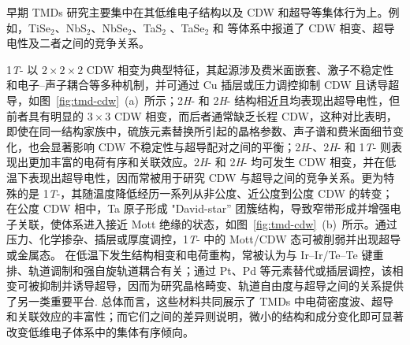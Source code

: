 早期 TMDs 研究主要集中在其低维电子结构以及 CDW 和超导等集体行为上。例如，TiSe$_2$、NbS$_2$、NbSe$_2$、TaS$_2$ 、TaSe$_2$ 和  等体系中报道了 CDW 相变、超导电性及二者之间的竞争关系\cite{vanmaarenSuperconductivitygroupVa1966,castronetoChargeDensityWave2001,rossnagelFermisurfacechargedensitywave2005,liuTuningchargedensity2015,siposMottstatesuperconductivity2008}。

1\textit{T}- 以 \(2\times2\times2\) CDW 相变为典型特征，其起源涉及费米面嵌套、激子不稳定性和电子--声子耦合等多种机制，并可通过 Cu 插层或压力调控抑制 CDW 且诱导超导\cite{castronetoChargeDensityWave2001,rossnagelFermisurfacechargedensitywave2005,morosanSuperconductivityCuxTiSe22006}，如图~\ref{fig:tmd-cdw}~(a)~所示；2\textit{H}- 和 2\textit{H}- 结构相近且均表现出超导电性，但前者具有明显的 \(3\times3\) CDW 相变，而后者通常缺乏长程 CDW\cite{xiStronglyEnhancedCharge2015,lerouxAnharmonicSuppressionCharge2012,heilOriginSuperconductivityLatent2017}，这种对比表明，即使在同一结构家族中，硫族元素替换所引起的晶格参数、声子谱和费米面细节变化，也会显著影响 CDW 不稳定性与超导配对之间的平衡；2\textit{H}-、2\textit{H}- 和 1\textit{T}- 则表现出更加丰富的电荷有序和关联效应。2\textit{H}- 和 2\textit{H}- 均可发生 CDW 相变，并在低温下表现出超导电性，因而常被用于研究 CDW 与超导之间的竞争关系\cite{liuTuningchargedensity2015,xiEnhancedSuperconductivityUpon2018}。更为特殊的是 1\textit{T}-，其随温度降低经历一系列从非公度、近公度到公度 CDW 的转变；在公度 CDW 相中，Ta 原子形成 "David-star'' 团簇结构，导致窄带形成并增强电子关联，使体系进入接近 Mott 绝缘的状态\cite{siposMottstatesuperconductivity2008,feiUnderstandingMottInsulating2022}，如图~\ref{fig:tmd-cdw}~(b)~所示。通过压力、化学掺杂、插层或厚度调控，1\textit{T}- 中的 Mott/CDW 态可被削弱并出现超导或金属态\cite{siposMottstatesuperconductivity2008}。 在低温下发生结构相变和电荷重构，常被认为与 Ir--Ir/Te--Te 键重排、轨道调制和强自旋轨道耦合有关；通过 Pt、Pd 等元素替代或插层调控，该相变可被抑制并诱导超导，因而为研究晶格畸变、轨道自由度与超导之间的关系提供了另一类重要平台\cite{yangSuperconductivityInducedBond2012,pyonSuperconductivityInducedIrTe22012,toriyamaOrbitalDegeneracyPeierls2012,fangStructuralPhaseTransition2013}. 总体而言，这些材料共同展示了 TMDs 中电荷密度波、超导和关联效应的丰富性；而它们之间的差异则说明，微小的结构和成分变化即可显著改变低维电子体系中的集体有序倾向。

